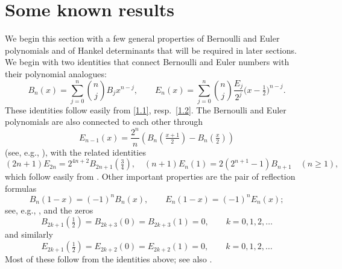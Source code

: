 \documentclass{amsart}
\theoremstyle{plain}
\numberwithin{equation}{section}
\begin{document}
\section{Some known results}

We begin this section with a few general properties of Bernoulli and 
Euler polynomials and of Hankel determinants that will 
be required in later sections.
We begin with two identities that connect Bernoulli and Euler numbers with their
polynomial analogues:
\begin{equation}\label{2.1}
B_n(x) = \sum_{j=0}^n\binom{n}{j}B_j x^{n-j},\qquad
E_n(x) = \sum_{j=0}^n\binom{n}{j}
\frac{E_j}{2^j}\big(x-\tfrac{1}{2}\big)^{n-j}.
\end{equation}
These identities follow easily from \eqref{1.1}, resp.\ \eqref{1.2}. The 
Bernoulli and Euler polynomials are also connected to each other through
\begin{equation}\label{2.2}
E_{n-1}(x) = \frac{2^n}{n}\left(B_n(\tfrac{x+1}{2})-B_n(\tfrac{x}{2})\right)
\end{equation}
(see, e.g., \cite[Eq.~24.4.23]{DLMF}), with the related identities
\begin{equation}\label{2.3}
(2n+1)E_{2n} = 2^{4n+2}B_{2n+1}(\tfrac{3}{4}),\quad
(n+1)E_n(1) = 2(2^{n+1}-1)B_{n+1}\quad(n\geq 1),
\end{equation}
which follow easily from \cite[Eq.~24.4.31, 24.4.26]{DLMF}.
Other important properties are the pair of reflection formulas
\begin{equation}\label{2.4}
B_{n}(1-x)=(-1)^{n}B_{n}(x),\qquad E_{n}(1-x)=(-1)^{n}E_{n}(x);
\end{equation}
see, e.g., \cite[Eq.~24.4.3, 24.4.4]{DLMF}, and the zeros
\begin{equation}\label{2.4a}
B_{2k+1}(\tfrac{1}{2})=B_{2k+3}(0)=B_{2k+3}(1)=0,\qquad k=0,1,2,\ldots
\end{equation}
and similarly
\begin{equation}\label{2.4b}
E_{2k+1}(\tfrac{1}{2})=E_{2k+2}(0)=E_{2k+2}(1)=0,\qquad k=0,1,2,\ldots
\end{equation}
Most of these follow from the identities above; see also 
\cite[Sect,~24.4(vi)]{DLMF}.
\end{document}
